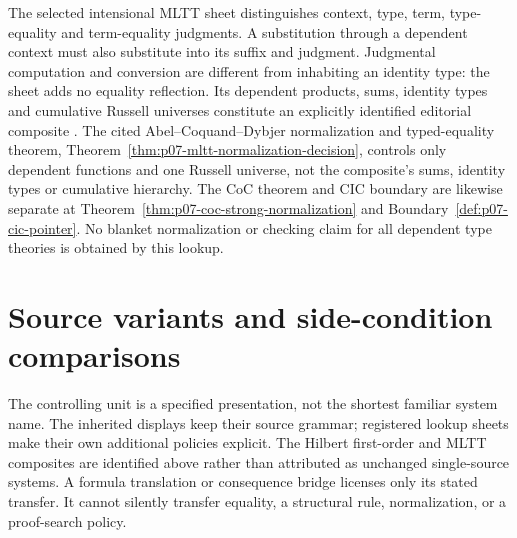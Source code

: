
The selected intensional MLTT sheet distinguishes context, type, term,
type-equality and term-equality judgments.  A substitution through a
dependent context must also substitute into its suffix and judgment.
Judgmental computation and conversion are different from inhabiting an
identity type: the sheet adds no equality reflection.  Its dependent
products, sums, identity types and cumulative Russell universes constitute
an explicitly identified editorial composite
\cite{MartinLof1984,NordstromPeterssonSmith1990,Hofmann1997}.
The cited Abel--Coquand--Dybjer normalization and typed-equality theorem,
Theorem~\ref{thm:p07-mltt-normalization-decision}, controls only dependent
functions and one Russell universe, not the composite's sums, identity
types or cumulative hierarchy.  The CoC theorem and CIC boundary are
likewise separate at Theorem~\ref{thm:p07-coc-strong-normalization} and
Boundary~\ref{def:p07-cic-pointer}.  No blanket normalization or checking
claim for all dependent type theories is obtained by this lookup.


\section{Source variants and side-condition comparisons}
\label{sec:p14-classical-calculi-variants}

The controlling unit is a specified presentation, not the shortest
familiar system name.  The inherited displays keep their source grammar;
registered lookup sheets make their own additional policies explicit.
The Hilbert first-order and MLTT composites are identified above rather
than attributed as unchanged single-source systems.  A formula translation
or consequence bridge licenses only its stated transfer.  It cannot
silently transfer equality, a structural rule, normalization, or a
proof-search policy.

